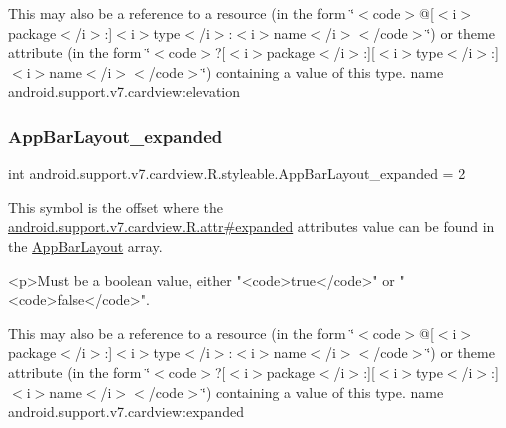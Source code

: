 This may also be a reference to a resource (in the form \char`\"{}$<$code$>$@\mbox{[}$<$i$>$package$<$/i$>$\+:\mbox{]}$<$i$>$type$<$/i$>$\+:$<$i$>$name$<$/i$>$$<$/code$>$\char`\"{}) or theme attribute (in the form \char`\"{}$<$code$>$?\mbox{[}$<$i$>$package$<$/i$>$\+:\mbox{]}\mbox{[}$<$i$>$type$<$/i$>$\+:\mbox{]}$<$i$>$name$<$/i$>$$<$/code$>$\char`\"{}) containing a value of this type.  name android.\+support.\+v7.\+cardview\+:elevation \mbox{\label{classandroid_1_1support_1_1v7_1_1cardview_1_1R_1_1styleable_a25a66e2f26717d1b0034f4cad6a32780}} 
\subsubsection{\texorpdfstring{App\+Bar\+Layout\+\_\+expanded}{AppBarLayout\_expanded}}
{\footnotesize\ttfamily int android.\+support.\+v7.\+cardview.\+R.\+styleable.\+App\+Bar\+Layout\+\_\+expanded = 2\hspace{0.3cm}{\ttfamily [static]}}

This symbol is the offset where the \hyperlink{classandroid_1_1support_1_1v7_1_1cardview_1_1R_1_1attr_a648bc14af4dface51acb88262207eebc}{android.\+support.\+v7.\+cardview.\+R.\+attr\#expanded} attribute\textquotesingle{}s value can be found in the \hyperlink{classandroid_1_1support_1_1v7_1_1cardview_1_1R_1_1styleable_ab9fe56d8bb5990d833de044115d0edbe}{App\+Bar\+Layout} array.

\begin{DoxyVerb}      <p>Must be a boolean value, either "<code>true</code>" or "<code>false</code>".
\end{DoxyVerb}
 

This may also be a reference to a resource (in the form \char`\"{}$<$code$>$@\mbox{[}$<$i$>$package$<$/i$>$\+:\mbox{]}$<$i$>$type$<$/i$>$\+:$<$i$>$name$<$/i$>$$<$/code$>$\char`\"{}) or theme attribute (in the form \char`\"{}$<$code$>$?\mbox{[}$<$i$>$package$<$/i$>$\+:\mbox{]}\mbox{[}$<$i$>$type$<$/i$>$\+:\mbox{]}$<$i$>$name$<$/i$>$$<$/code$>$\char`\"{}) containing a value of this type.  name android.\+support.\+v7.\+cardview\+:expanded \mbox{\label{classandroid_1_1support_1_1v7_1_1cardview_1_1R_1_1styleable_af9edb99ce8a17a0ba323d6a695308d5d}} 
